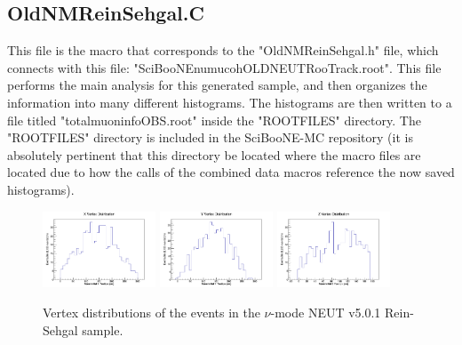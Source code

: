 \documentclass[11pt]{article}
\begin{document}
\subsection{OldNMReinSehgal.C}
\label{sub:OldNMReinSehgal.C}
This file is the macro that corresponds to the "OldNMReinSehgal.h" file, which connects with this file: "SciBooNE\textunderscore numu\textunderscore coh\textunderscore OLDNEUT\textunderscore RooTrack.root". This file performs the main analysis for this generated sample, and then organizes the information into many different histograms. The histograms are then written to a file titled "totalmuoninfoOBS.root" inside the "ROOTFILES" directory. The "ROOTFILES" directory is included in the SciBooNE-MC repository (it is absolutely pertinent that this directory be located where the macro files are located due to how the calls of the combined data macros reference the now saved histograms).

\begin{figure}[H]
\centering
\includegraphics[width=0.3\textwidth]{OldNMReinSehgalImages/4-XVertexDistributionNMORS.png}
\includegraphics[width=0.3\textwidth]{OldNMReinSehgalImages/3-YVertexDistributionNMORS.png}
\includegraphics[width=0.3\textwidth]{OldNMReinSehgalImages/2-ZVertexDistributionNMORS.png}
\caption{Vertex distributions of the events in the $\nu$-mode NEUT v5.0.1 Rein-Sehgal sample.}
\label{fig:app:NMVertexDistributionORS}
\end{figure}
\end{document}
